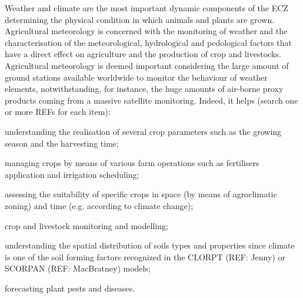 \documentclass[authoryear,preprint,review,12pt]{elsarticle}
\begin{document}

Weather and climate are the most important dynamic components of the ECZ determining the physical condition in which animals and plants are grown.
Agricultural meteorology is concerned with the monitoring of weather and the characterisation of the meteorological, hydrological and pedological factors that have a direct effect on agriculture and the production of crop and livestocks.
Agricultural meteorology is deemed important considering the large amount of ground stations available worldwide to monitor the behaviour of weather elements, notwithstanding, for instance, the huge amounts of air-borne proxy products coming from a massive satellite monitoring.
Indeed, it helps (search one or more REFs for each item): 
    \begin{enumerate*}
        \item understanding the realisation of several crop parameters such as the growing season and the harvesting time;
        \item managing crops by means of various farm operations such as fertilisers application and irrigation scheduling;
        \item assessing the suitability of specific crops in space (by means of agroclimatic zoning) and time (e.g. according to climate change);
        \item crop and livestock monitoring and modelling;
        \item understanding the spatial distribution of soils types and properties since climate is one of the soil forming factors recognized in the CLORPT (REF: Jenny) or SCORPAN (REF: MacBratney) models;
        \item forecasting plant pests and diseases.
    \end{enumerate*}
\end{document}
